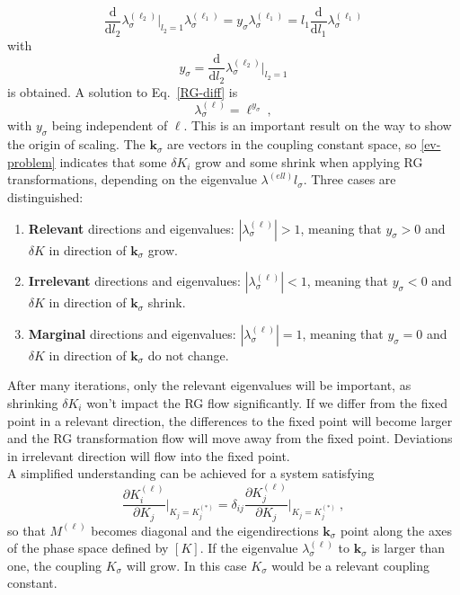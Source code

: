 	\begin{equation}\label{RG-diff}
		\frac{\text{d}}{\text{d}l_2} \lambda^{(\ell_2)}_{\sigma} \bigg |_{l_2 =	1} \lambda^{(\ell_1)}_{\sigma}  = y_\sigma \lambda^{(\ell_1)}_{\sigma} = l_1 \frac{\text{d}}{\text{d}l_1} \lambda^{(\ell_1)}_{\sigma}
	\end{equation}
	with
	\begin{equation}
		y_\sigma = \frac{\text{d}}{\text{d}l_2} \lambda^{(\ell_2)}_{\sigma} \bigg |_{l_2 =	1}
	\end{equation}
	is obtained.
	A solution to Eq.~{\eqref{RG-diff}} is
	\begin{equation} \label{ev-form}
		\lambda^{(\ell)}_{\sigma} = \ell^{y_\sigma}~,
	\end{equation}
	with $y_\sigma$ being independent of $\ell$. This is an important result on the way to show the origin of scaling. The $\boldsymbol{k}_{\sigma}$ are vectors in the coupling constant space, so \autoref{ev-problem} indicates that some $\delta K_i$ grow and some shrink when applying RG transformations, depending on the eigenvalue $\lambda^{(ell)}l_{\sigma}$. Three cases are distinguished:
	\begin{enumerate}
		\item \textbf{Relevant} directions and eigenvalues:	$|\lambda^{(\ell)}_{\sigma}| > 1$, meaning that $y_\sigma > 0$ and $\delta K$ in direction of $\boldsymbol{k}_{\sigma}$ grow.
		\item \textbf{Irrelevant} directions and eigenvalues:	$|\lambda^{(\ell)}_{\sigma}| < 1$, meaning that $y_\sigma < 0$ and $\delta K$ in direction of $\boldsymbol{k}_{\sigma}$ shrink.
		\item \textbf{Marginal} directions and eigenvalues:	$|\lambda^{(\ell)}_{\sigma}| = 1$, meaning that $y_\sigma = 0$ and $\delta K$ in direction of $\boldsymbol{k}_{\sigma}$ do not change.
	\end{enumerate}
	After many iterations, only the relevant eigenvalues will be important, as shrinking $\delta K_i$ won't impact the RG flow significantly. If we differ from the fixed point in a relevant direction, the differences to the fixed point will become larger and the RG transformation flow will move away from the fixed point. Deviations in irrelevant direction will flow into the fixed point. \\
	
	A simplified understanding can be achieved for a system satisfying
	\begin{equation}
		\frac{\partial K_i^{(\ell)}}{\partial K_j} \bigg |_{K_j = K_j^{(*)}} = \delta_{ij} \frac{\partial K_j^{(\ell)}}{\partial K_j} \bigg |_{K_j = K_j^{(*)}}~,
	\end{equation}
	so that $M^{(\ell)}$ becomes diagonal and the eigendirections $\boldsymbol{k}_{\sigma}$ point along the axes of the phase space defined by $[K]$. If the eigenvalue $\lambda^{(\ell)}_{\sigma}$ to $\boldsymbol{k}_{\sigma}$ is larger than one, the coupling $K_\sigma$ will grow. In this case $K_\sigma$ would be a relevant coupling constant. \\
	
